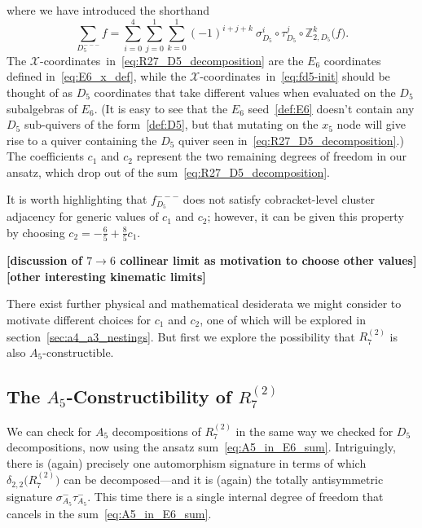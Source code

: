 \documentclass[11pt]{article}
\def\xcoords{$\mathcal{X}$-coordinates}
\def\draftnote#1{{\bf [#1]}}
\def\pdfeq#1{\texorpdfstring{$#1$}{a}}
\begin{document}
where we have introduced the shorthand
\begin{equation}
	\sum_{D_5^{---}} f = \sum_{i=0}^4\sum_{j=0}^1\sum_{k=0}^1 (-1)^{i+j+k}\  \sigma_{D_5}^i \circ \tau_{D_5}^j \circ \mathbb{Z}_{2,D_5}^k \big(f\big).
\end{equation}
The \xcoords\ in~\eqref{eq:R27_D5_decomposition} are the $E_6$ coordinates defined in~\eqref{eq:E6_x_def}, while the \xcoords\ in~\eqref{eq:fd5-init} should be thought of as $D_5$ coordinates that take different values when evaluated on the $D_5$ subalgebras of $E_6$. (It is easy to see that the $E_6$ seed~\eqref{def:E6} doesn't contain any $D_5$ sub-quivers of the form~\eqref{def:D5}, but that mutating on the $x_5$ node will give rise to a quiver containing the $D_5$ quiver seen in~\eqref{eq:R27_D5_decomposition}.) The coefficients $c_1$ and $c_2$ represent the two remaining degrees of freedom in our ansatz, which drop out of the sum~\eqref{eq:R27_D5_decomposition}.

It is worth highlighting that $f_{D_5}^{---}$ does not satisfy cobracket-level cluster adjacency for generic values of $c_1$ and $c_2$; however, it can be given this property by choosing $c_2 = -\frac{6}{5} + \frac{8}{5} c_1$. 

\draftnote{discussion of $7\to6$ collinear limit as motivation to choose other values}
\draftnote{other interesting kinematic limits}

There exist further physical and mathematical desiderata we might consider to motivate different choices for $c_1$ and $c_2$, one of which will be explored in section~\ref{sec:a4_a3_nestings}. But first we explore the possibility that $R^{(2)}_7$ is also $A_5$-constructible.

\subsection{The \pdfeq{A_5}-Constructibility of \pdfeq{R^{(2)}_7}}\label{sec:a5-func}

We can check for $A_5$ decompositions of $R^{(2)}_7$ in the same way we checked for $D_5$ decompositions, now using the ansatz sum~\eqref{eq:A5_in_E6_sum}. Intriguingly, there is (again) precisely one automorphism signature in terms of which $\delta_{2,2}\big(R^{(2)}_7\big)$ can be decomposed---and it is (again) the totally antisymmetric signature $\sigma_{A_5}^-\tau_{A_5}^-$. This time there is a single internal degree of freedom that cancels in the sum~\eqref{eq:A5_in_E6_sum}. \
\end{document}
